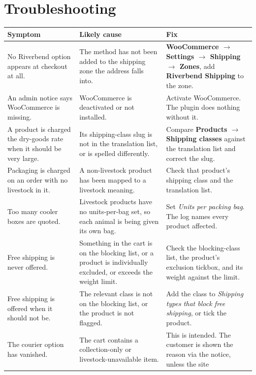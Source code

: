 \documentclass[11pt,a4paper,oneside]{report}
\newcommand{\menu}[1]{\textsf{\textbf{#1}}}
\begin{document}
\chapter{Troubleshooting}

\begin{longtable}{@{}L{4.6cm}L{4.8cm}L{5.4cm}@{}}
\toprule
\textbf{Symptom} & \textbf{Likely cause} & \textbf{Fix}\\
\midrule
\endhead
No Riverbend option appears at checkout at all. &
The method has not been added to the shipping zone the address falls into. &
\menu{WooCommerce $\rightarrow$ Settings $\rightarrow$ Shipping $\rightarrow$ Zones},
add \menu{Riverbend Shipping} to the zone.\\
\addlinespace
An admin notice says WooCommerce is missing. &
WooCommerce is deactivated or not installed. &
Activate WooCommerce. The plugin does nothing without it.\\
\addlinespace
A product is charged the dry-goods rate when it should be very large. &
Its shipping-class slug is not in the translation list, or is spelled differently. &
Compare \menu{Products $\rightarrow$ Shipping classes} against the translation list
and correct the slug.\\
\addlinespace
Packaging is charged on an order with no livestock in it. &
A non-livestock product has been mapped to a livestock meaning. &
Check that product's shipping class and the translation list.\\
\addlinespace
Too many cooler boxes are quoted. &
Livestock products have no units-per-bag set, so each animal is being given its own
bag. &
Set \emph{Units per packing bag}. The log names every product affected.\\
\addlinespace
Free shipping is never offered. &
Something in the cart is on the blocking list, or a product is individually excluded,
or exceeds the weight limit. &
Check the blocking-class list, the product's exclusion tickbox, and its weight against
the limit.\\
\addlinespace
Free shipping is offered when it should not be. &
The relevant class is not on the blocking list, or the product is not flagged. &
Add the class to \emph{Shipping types that block free shipping}, or tick the product.\\
\addlinespace
The courier option has vanished. &
The cart contains a collection-only or livestock-unavailable item. &
This is intended. The customer is shown the reason via the notice, unless the site

\end{longtable}
\end{document}
